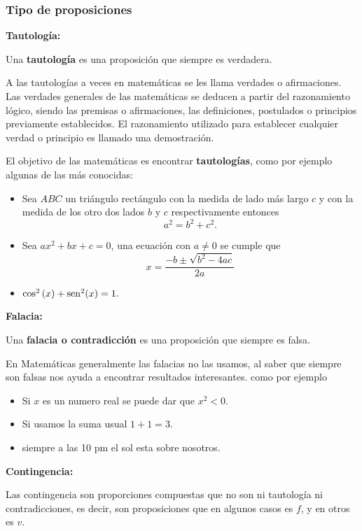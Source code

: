 \subsubsection{Tipo de proposiciones}

\vspace*{20pt}\begin{ideabox}{\bf Tautología:} 

Una \textbf{tautología} es una proposición que siempre es verdadera. 

\end{ideabox}

A las tautologías a veces en matemáticas se les llama verdades o afirmaciones.
Las verdades generales de las matemáticas se deducen a partir del
razonamiento lógico, siendo las premisas o afirmaciones, las definiciones,
postulados o principios previamente establecidos. El razonamiento
utilizado para establecer cualquier verdad o principio es llamado
una demostración.

El objetivo de las matemáticas es encontrar \textbf{tautologías},
como por ejemplo algunas de las más conocidas:
\begin{itemize}
\item Sea \triangulo $ABC$ un triángulo rectángulo con la medida de lado
más largo $c$ y con la medida de los otro dos lados $b$ y $c$ respectivamente
entonces 
\[
a^{2}=b^{2}+c^{2}.
\]
\item Sea $ax^{2}+bx+c=0$, una ecuación con $a\ne0$ se cumple que 
\[
x=\dfrac{-b\pm\sqrt{b^{2}-4ac}}{2a}
\]
\item $\cos^{2}\left(x\right)+\operatorname{sen}^{2}(x)=1.$
\end{itemize}
\vspace*{-70pt}\begin{ideabox}{\bf Falacia:}

Una \textbf{falacia o contradicción} es una proposición que siempre
es falsa. 

\end{ideabox}

En Matemáticas generalmente las falacias no las usamos, al saber que
siempre son falsas nos ayuda a encontrar resultados interesantes.
como por ejemplo 
\begin{itemize}
\item Si $x$ es un numero real se puede dar que $x^{2}<0.$
\item Si usamos la suma usual $1+1=3.$
\item siempre a las 10 pm el sol esta sobre nosotros.
\end{itemize}
\vspace*{-70pt}\begin{ideabox}{\bf Contingencia:}

Las contingencia son proporciones compuestas que no son ni tautología
ni contradicciones, es decir, son proposiciones que en algunos casos
es $f$, y en otros es $v$.\end{ideabox} 

